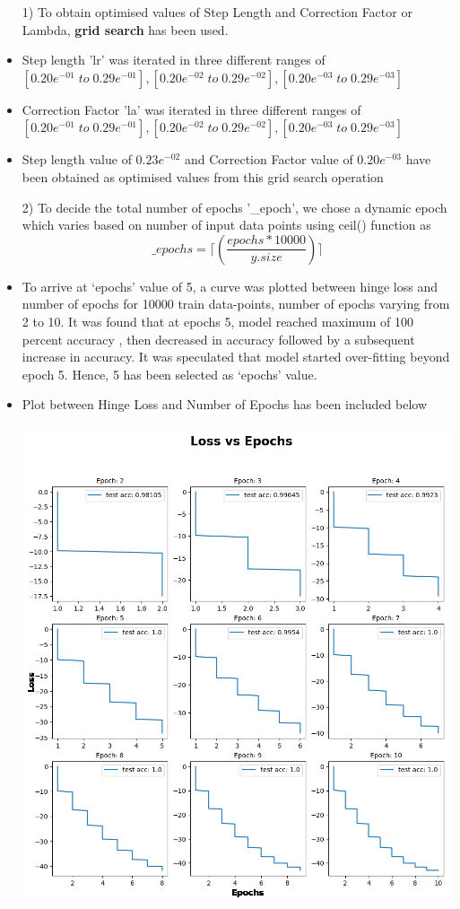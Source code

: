 \documentclass{article}
\begin{document}
\begin{itemize}
\item[1)] To obtain optimised values of Step Length and Correction Factor or Lambda, \textbf{grid search} has been used.
\item Step length 'lr' was iterated in three different ranges of $[0.20e^{-01} \; to \; 0.29e^{-01}],[0.20e^{-02}\;  to \; 0.29e^{-02}],[0.20e^{-03} \; to \; 0.29e^{-03}]$
\item Correction Factor 'la' was iterated in three different ranges of $[0.20e^{-01} \; to \; 0.29e^{-01}],[0.20e^{-02}\;  to \; 0.29e^{-02}],[0.20e^{-03} \; to \; 0.29e^{-03}]$
\item Step length value of $0.23e^{-02}$ and Correction Factor value of $0.20e^{-03}$ have been obtained as optimised values from this grid search operation
\item[2)] To decide the total number of epochs '\_epoch', we chose a dynamic epoch which varies based on number of input data points using ceil() function as 
\[\_epochs = \lceil(\frac{epochs*10000}{y.size})\rceil\]
\item To arrive at ‘epochs’ value of 5, a curve was plotted between hinge loss and number of epochs for 10000 train data-points, number of epochs varying from 2 to 10. It was found that at epochs 5, model reached maximum of 100 percent accuracy , then decreased in accuracy followed by a subsequent increase in accuracy. It was speculated that model started over-fitting beyond epoch 5. Hence,  5 has been selected as ‘epochs’ value.
\item Plot between Hinge Loss and Number of Epochs has been included below\\
\\
\includegraphics[scale=0.4]{images/Loss.jpeg}
\end{itemize}
\end{document}
